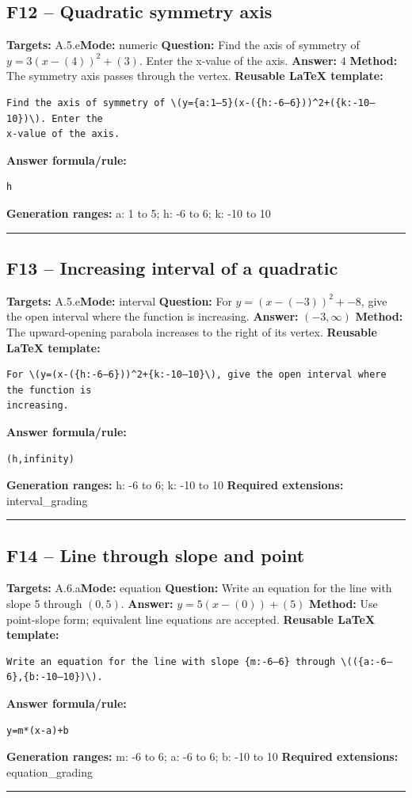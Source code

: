 \documentclass[11pt]{article}
\begin{document}
\subsection{F12 -- Quadratic symmetry axis}
\textbf{Targets:} A.5.e\quad\textbf{Mode:} numeric
\textbf{Question:} Find the axis of symmetry of \(y=3(x-(4))^2+(3)\). Enter the x-value of the axis.
\textbf{Answer:} \(4\)
\textbf{Method:} The symmetry axis passes through the vertex.
\textbf{Reusable LaTeX template:}
\begin{verbatim}
Find the axis of symmetry of \(y={a:1–5}(x-({h:-6–6}))^2+({k:-10–10})\). Enter the
x-value of the axis.
\end{verbatim}
\textbf{Answer formula/rule:}
\begin{verbatim}
h
\end{verbatim}
\textbf{Generation ranges:} a: 1 to 5; h: -6 to 6; k: -10 to 10
\medskip\hrule\medskip
\subsection{F13 -- Increasing interval of a quadratic}
\textbf{Targets:} A.5.e\quad\textbf{Mode:} interval
\textbf{Question:} For \(y=(x-(-3))^2+-8\), give the open interval where the function is increasing.
\textbf{Answer:} \((-3,\infty)\)
\textbf{Method:} The upward-opening parabola increases to the right of its vertex.
\textbf{Reusable LaTeX template:}
\begin{verbatim}
For \(y=(x-({h:-6–6}))^2+{k:-10–10}\), give the open interval where the function is
increasing.
\end{verbatim}
\textbf{Answer formula/rule:}
\begin{verbatim}
(h,infinity)
\end{verbatim}
\textbf{Generation ranges:} h: -6 to 6; k: -10 to 10
\textbf{Required extensions:} interval\_grading
\medskip\hrule\medskip
\subsection{F14 -- Line through slope and point}
\textbf{Targets:} A.6.a\quad\textbf{Mode:} equation
\textbf{Question:} Write an equation for the line with slope 5 through \((0,5)\).
\textbf{Answer:} \(y=5(x-(0))+(5)\)
\textbf{Method:} Use point-slope form; equivalent line equations are accepted.
\textbf{Reusable LaTeX template:}
\begin{verbatim}
Write an equation for the line with slope {m:-6–6} through \(({a:-6–6},{b:-10–10})\).
\end{verbatim}
\textbf{Answer formula/rule:}
\begin{verbatim}
y=m*(x-a)+b
\end{verbatim}
\textbf{Generation ranges:} m: -6 to 6; a: -6 to 6; b: -10 to 10
\textbf{Required extensions:} equation\_grading
\medskip\hrule\medskip
\end{document}
